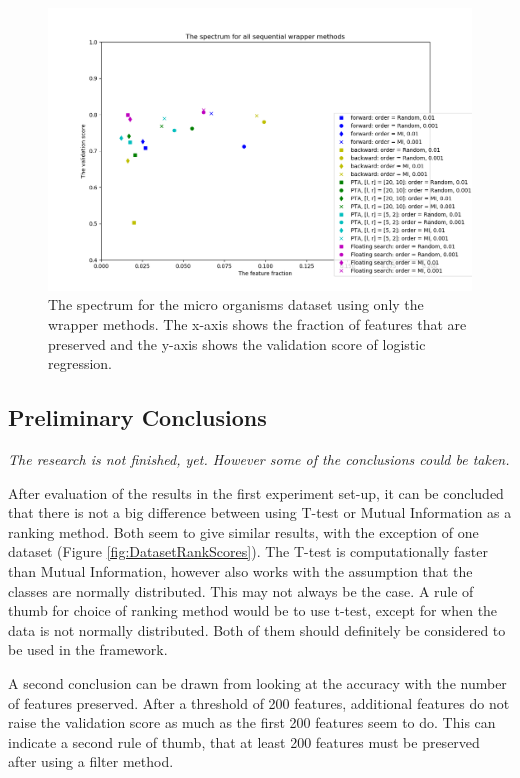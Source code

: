 \documentclass[10pt,a4paper]{article}
\begin{document}
	\begin{figure}[H]
		\includegraphics[width=1\textwidth]{MO_Val_Wrapper_Spectrum.png}
		\caption{The spectrum for the micro organisms dataset using only the wrapper methods. The x-axis shows the fraction of features that are preserved and the y-axis shows the validation score of logistic regression.}
		\label{fig:MO_Val_Wrapper_Spectrum}
	\end{figure}
	
	
	\subsection{Preliminary Conclusions}
	
	\textit{The research is not finished, yet. However some of the conclusions could be taken.}
	
	After evaluation of the results in the first experiment set-up, it can be concluded that there is not a big difference between using T-test or Mutual Information as a ranking method. Both seem to give similar results, with the exception of one dataset (Figure \ref{fig:DatasetRankScores}). The T-test is computationally faster than Mutual Information, however also works with the assumption that the classes are normally distributed. This may not always be the case. A rule of thumb for choice of ranking method would be to use t-test, except for when the data is not normally distributed. Both of them should definitely be considered to be used in the framework.
	
	A second conclusion can be drawn from looking at the accuracy with the number of features preserved. After a threshold of 200 features, additional features do not raise the validation score as much as the first 200 features seem to do. This can indicate a second rule of thumb, that at least 200 features must be preserved after using a filter method.
	
\end{document}
